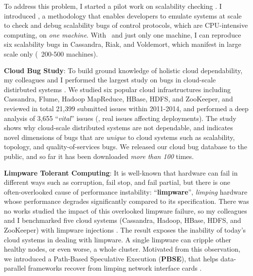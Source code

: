 \documentclass[10pt]{article}
\begin{document}
To address this problem, I started a pilot work on scalability checking
\cite{Gunawi+17-SCk-Insub,Leesatapornwongsa+17-SCk-InPrep}. I introduced \sck, a
methodology that enables developers to emulate systems at scale to check and
debug scalability bugs of control protocols, which are CPU-intensive computing,
on \textit{one machine}. 
%
With \sck\ and just only one machine, I can reproduce six scalability bugs in
Cassandra, Riak, and Voldemort, which manifest in large scale only (\eg\
200-500 machines). 


\noindent
\textbf{Cloud Bug Study}: To build ground knowledge of holistic cloud
dependability, my colleagues and I performed the largest study on bugs in
cloud-scale distirbuted systems \cite{Gunawi+14-Cbs}. We studied six popular
cloud infrastructures including Cassandra, Flume, Hadoop MapReduce, HBase, HDFS,
and ZooKeeper, and reviewed in total 21,399 submitted issues within 2011-2014,
and performed a deep analysis of 3,655 ``\textit{vital}'' issues (\ie, real
issues affecting deployments). The study shows why cloud-scale distributed
systems are not dependable, and indicates novel dimensions of bugs that are
\textit{unique} to cloud systems such as scalability, topology, and
quality-of-services bugs. We released our cloud bug database to the public, and
so far it has been downloaded \textit{more than 100} times.



\noindent
\textbf{Limpware Tolerant Computing}: It is well-known that hardware can fail in
different ways such as corruption, fail stop, and fail partial, but there is one
often-overlooked cause of performance instability:
``\textbf{limpware}'', \textit{limping} hardware whose performance
degrades significantly compared to its specification. There was no works
studied the impact of this overlooked limpware failure, so my colleagues and I
benchmarked five cloud systems (Cassandra, Hadoop, HBase, HDFS, and ZooKeeper)
with limpware injections \cite{Do+13-Limplock}. The result exposes the inability
of today's cloud systems in dealing with limpware. A single limpware can cripple
other healthy nodes, or even worse, a whole cluster. Motivated from this
observation, we introduced a Path-Based Speculative Execution
(\textbf{PBSE}), that helps data-parallel frameworks recover from limping
network interface cards \cite{Suminto+17-PBSE-InPrep}.
\end{document}
